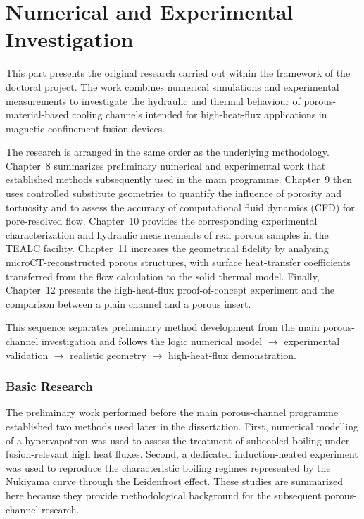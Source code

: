 \documentclass[a4paper]{article}
\begin{document}
\pagebreak

\part{Numerical and Experimental Investigation}
This part presents the original research carried out within the framework of the doctoral project. The work combines numerical simulations and experimental measurements to investigate the hydraulic and thermal behaviour of porous-material-based cooling channels intended for high-heat-flux applications in magnetic-confinement fusion devices.

The research is arranged in the same order as the underlying methodology. Chapter~8 summarizes preliminary numerical and experimental work that established methods subsequently used in the main programme. Chapter~9 then uses controlled substitute geometries to quantify the influence of porosity and tortuosity and to assess the accuracy of computational fluid dynamics (CFD) for pore-resolved flow. Chapter~10 provides the corresponding experimental characterization and hydraulic measurements of real porous samples in the TEALC facility. Chapter~11 increases the geometrical fidelity by analysing microCT-reconstructed porous structures, with surface heat-transfer coefficients transferred from the flow calculation to the solid thermal model. Finally, Chapter~12 presents the high-heat-flux proof-of-concept experiment and the comparison between a plain channel and a porous insert.

This sequence separates preliminary method development from the main porous-channel investigation and follows the logic numerical model $\rightarrow$ experimental validation $\rightarrow$ realistic geometry $\rightarrow$ high-heat-flux demonstration.

\pagebreak
\section{Basic Research}
The preliminary work performed before the main porous-channel programme established two methods used later in the dissertation. First, numerical modelling of a hypervapotron was used to assess the treatment of subcooled boiling under fusion-relevant high heat fluxes. Second, a dedicated induction-heated experiment was used to reproduce the characteristic boiling regimes represented by the Nukiyama curve through the Leidenfrost effect. These studies are summarized here because they provide methodological background for the subsequent porous-channel research.
\end{document}
